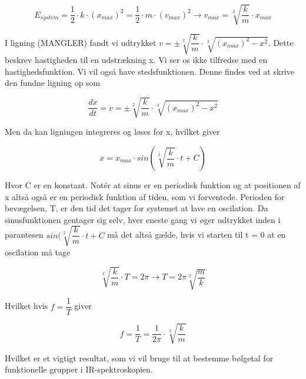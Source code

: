 \begin{center}
\begin{equation}
E_{system} = \dfrac{1}{2} \cdot k \cdot (x_{max})^2 = \dfrac{1}{2} \cdot m \cdot (v_{max})^2 \rightarrow v_{max} = \sqrt[2]{\dfrac{k}{m}} \cdot x_{max}
\end{equation}
\end{center}

I ligning (MANGLER) fandt vi udtrykket $v = \pm \sqrt[2]{\dfrac{k}{m}} \cdot \sqrt[2]{(x_{max})^2-x^2}$. Dette beskrev hastigheden til en udstrækning x. Vi ser os ikke tilfredse med en hastighedsfunktion. Vi vil også have stedsfunktionen. Denne findes ved at skrive den fundne ligning op som 

\begin{center}
\begin{equation}
\dfrac{dx}{dt} = v = \pm \sqrt[2]{\dfrac{k}{m}} \cdot \sqrt[2]{(x_{max})^2-x^2}
\end{equation}
\end{center}

Men da kan ligningen integreres og løses for x, hvilket giver

\begin{center}
\begin{equation}
x = x_{max} \cdot sin(\sqrt[2]{\dfrac{k}{m}} \cdot t + C)
\end{equation}
\end{center}
\bigskip
Hvor C er en konstant. Notér at sinus er en periodisk funktion og at positionen af x altså også er en periodisk funktion af tiden, som vi forventede. Perioden for bevægelsen, T, er den tid det tager for systemet at lave en oscilation. Da sinusfunktionen gentager sig selv, hver eneste gang vi øger udtrykket inden i parantesen $sin(\sqrt[2]{\dfrac{k}{m}} \cdot t + C$ må det altså gælde, hvis vi starten til t = 0 at en oscilation må tage

\begin{center}
\begin{equation}
\sqrt[2]{\dfrac{k}{m}} \cdot T = 2 \pi \rightarrow T = 2 \pi \sqrt[2]{\dfrac{m}{k}}
\end{equation}
\end{center}

Hvilket hvis $f = \dfrac{1}{T}$ giver

\begin{center}
\begin{equation}
f = \dfrac{1}{T} = \dfrac{1}{2 \pi} \cdot \sqrt[2]{\dfrac{k}{m}}
\end{equation}
\end{center}

Hvilket er et vigtigt resultat, som vi vil bruge til at bestemme bølgetal for funktionelle grupper i IR-spektroskopien. 